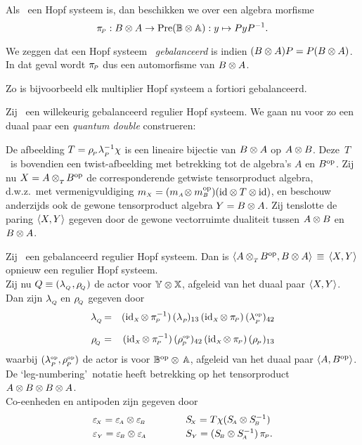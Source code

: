 \documentclass{book}
\begin{document}
Als \pairAB\ een Hopf systeem is, dan beschikken we over een algebra morfisme
$$ \pi_{\scriptscriptstyle \! P} : B \otimes A \rightarrow \mbox{\rm Pre}(\mathbb{B} \otimes \mathbb{A}): y \mapsto P y P^{-1}. $$

\begin{defn} \rm
We zeggen dat een Hopf systeem \pairAB\ {\em gebalanceerd\/} is indien
$(B\otimes A)P = P(B\otimes A)$.
In dat geval wordt $\pi_{\scriptscriptstyle \! P}$ dus een automorfisme van $B \otimes A$.
\end{defn}

Zo is bijvoorbeeld elk multiplier Hopf systeem a fortiori gebalanceerd.

Zij \pairAB\ een willekeurig gebalanceerd regulier Hopf systeem.
We gaan nu voor zo een duaal paar een {\em quantum double\/} construeren:

De afbeelding \mbox{$T=\rho_{_{\!P}}\lambda_{_P\!}^{-1}\chi$}
is een lineaire bijectie van $B \otimes A$ op $A \otimes B$.
\mbox{Deze $T$}\ is bovendien een twist-afbeelding met betrekking tot de algebra's $A$ en $B^{\rm op}$.
Zij nu $X=A \otimes_{_T\!} B^{\rm op}$ de corresponderende getwiste tensorproduct algebra,
d.w.z.\ met vermenigvuldiging
$m_{\scriptscriptstyle X} = (m_{\scriptscriptstyle A} \! \otimes  m_{\scriptscriptstyle B}^{\rm op})(\mbox{\rm id} \otimes T \otimes \mbox{\rm id})$,
en beschouw anderzijds ook de gewone tensorproduct algebra $Y=B\otimes A$.
Zij tenslotte de paring $\langle X,Y \rangle$ gegeven door de gewone vectorruimte
dualiteit tussen $A \otimes B$ en $B \otimes A$.

\begin{thm}
Zij\/ \pairAB\ een gebalanceerd regulier Hopf systeem.
Dan is\/ $\langle A \otimes_{_T\!} B^{\rm op},B \otimes A \rangle \,\equiv\, \langle X,Y \rangle$
opnieuw een regulier Hopf systeem.\\
Zij nu\/ $Q\equiv(\lambda_{_Q\!}\, ,\rho_{_{\!Q}})$ de actor voor\/ $\mathbb{Y} \otimes \mathbb{X}$, afgeleid van
het duaal paar\/ $\langle X,Y \rangle$. Dan zijn\/ $\lambda_{_Q\!}$ en\/ $\rho_{_{\!Q}}$ gegeven door
\begin{eqnarray*}
\lQ &=& (\idX \tens \piP^{-1}) \, (\lp)_{13} \, (\idX \tens \piP) \, (\lpop)_{42}
\\
\rQ  &=& (\idX \tens \piP^{-1}) \, (\rpop)_{42} \, (\idX \tens \piP) \,  (\rp)_{13}
\vertXL
\end{eqnarray*}
waarbij\/ $(\lambda^{\scriptscriptstyle \rm op}_{_P\!},\rho^{\scriptscriptstyle \rm op}_{_{\!P}})$ de actor is voor\/ $\mathbb{B}^{\rm op} \otimes\, \mathbb{A}$,
afgeleid van het duaal paar\/ $\langle A,B^{\rm op} \rangle$.
De \lq leg-numbering\rq\ notatie heeft betrekking op het tensorproduct\/
$A \otimes B \otimes B \otimes A$. \\
Co-eenheden en antipoden zijn gegeven door
$$\begin{array}{lcl}
  \epsX = \epsA \tens \epsB   &\hspace{2em}&  \SX = T\flip(\SA \tens \SB^{-1})    \\
  \epsY = \epsB \tens \epsA   &            &  \SY = (\SB \tens \SA^{-1})\, \piP. \vertL
\end{array} $$
\end{thm}
\end{document}
